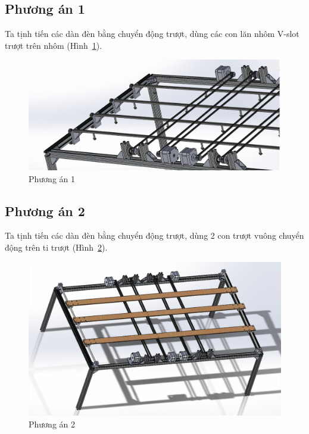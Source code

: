 \subsection{Phương án 1}
Ta tịnh tiến các dàn đèn bằng chuyển động trượt, dùng các con lăn nhôm V-slot trượt trên nhôm (Hình~\ref{fig:phuongan1}).
\begin{center}
    \begin{figure}[ht]
    \begin{center}
     \includegraphics[scale=1]{Chapters/Chapter3/Images/Phuongan1}
    \end{center}
    \caption{Phương án 1}
    \label{fig:phuongan1}
    \end{figure}
\end{center}

\subsection{Phương án 2}
Ta tịnh tiến các dàn đèn bằng chuyển động trượt, dùng 2 con trượt vuông chuyển động trên ti trượt (Hình~\ref{fig:phuongan2}). 
\begin{center}
    \begin{figure}[htp]
    \begin{center}
     \includegraphics[scale=1]{Chapters/Chapter3/Images/Phuongan2}
    \end{center}
    \caption{Phương án 2}
    \label{fig:phuongan2}
    \end{figure}
\end{center}

